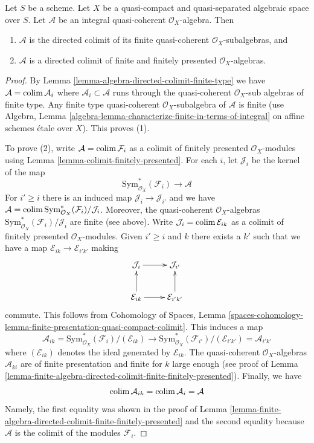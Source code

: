 \begin{lemma}
\label{lemma-integral-algebra-directed-colimit-finite}
Let $S$ be a scheme. Let $X$ be a quasi-compact and quasi-separated
algebraic space over $S$. Let $\mathcal{A}$ be an integral quasi-coherent
$\mathcal{O}_X$-algebra. Then
\begin{enumerate}
\item $\mathcal{A}$ is the directed colimit of its finite
quasi-coherent $\mathcal{O}_X$-subalgebras, and
\item $\mathcal{A}$ is a directed colimit of finite and finitely presented
$\mathcal{O}_X$-algebras.
\end{enumerate}
\end{lemma}

\begin{proof}
By Lemma \ref{lemma-algebra-directed-colimit-finite-type} we have
$\mathcal{A} = \mathop{\mathrm{colim}}\nolimits \mathcal{A}_i$ where
$\mathcal{A}_i \subset \mathcal{A}$ runs through the
quasi-coherent $\mathcal{O}_X$-sub algebras of finite type.
Any finite type quasi-coherent $\mathcal{O}_X$-subalgebra
of $\mathcal{A}$ is finite (use Algebra, Lemma
\ref{algebra-lemma-characterize-finite-in-terms-of-integral}
on affine schemes \'etale over $X$). This proves (1).

\medskip\noindent
To prove (2), write $\mathcal{A} = \mathop{\mathrm{colim}}\nolimits \mathcal{F}_i$
as a colimit of finitely presented $\mathcal{O}_X$-modules using
Lemma \ref{lemma-colimit-finitely-presented}.
For each $i$, let $\mathcal{J}_i$ be the kernel of the map
$$
\text{Sym}^*_{\mathcal{O}_X}(\mathcal{F}_i) \longrightarrow \mathcal{A}
$$
For $i' \geq i$ there is an induced map $\mathcal{J}_i \to \mathcal{J}_{i'}$
and we have $\mathcal{A} =
\mathop{\mathrm{colim}}\nolimits \text{Sym}^*_{\mathcal{O}_X}(\mathcal{F}_i)/\mathcal{J}_i$.
Moreover, the quasi-coherent $\mathcal{O}_X$-algebras
$\text{Sym}^*_{\mathcal{O}_X}(\mathcal{F}_i)/\mathcal{J}_i$
are finite (see above). Write $\mathcal{J}_i = \mathop{\mathrm{colim}}\nolimits \mathcal{E}_{ik}$
as a colimit of finitely presented $\mathcal{O}_X$-modules.
Given $i' \geq i$ and $k$ there exists a $k'$ such that we
have a map $\mathcal{E}_{ik} \to \mathcal{E}_{i'k'}$
making
$$
\xymatrix{
\mathcal{J}_i \ar[r] & \mathcal{J}_{i'} \\
\mathcal{E}_{ik} \ar[u] \ar[r] & \mathcal{E}_{i'k'} \ar[u]
}
$$
commute. This follows from
Cohomology of Spaces, Lemma
\ref{spaces-cohomology-lemma-finite-presentation-quasi-compact-colimit}.
This induces a map
$$
\mathcal{A}_{ik} =
\text{Sym}^*_{\mathcal{O}_X}(\mathcal{F}_i)/(\mathcal{E}_{ik})
\longrightarrow
\text{Sym}^*_{\mathcal{O}_X}(\mathcal{F}_{i'})/(\mathcal{E}_{i'k'}) =
\mathcal{A}_{i'k'}
$$
where $(\mathcal{E}_{ik})$ denotes the ideal generated by $\mathcal{E}_{ik}$.
The quasi-coherent $\mathcal{O}_X$-algebras $\mathcal{A}_{ki}$
are of finite presentation and finite for $k$ large enough
(see proof of
Lemma \ref{lemma-finite-algebra-directed-colimit-finite-finitely-presented}).
Finally, we have
$$
\mathop{\mathrm{colim}}\nolimits \mathcal{A}_{ik} = \mathop{\mathrm{colim}}\nolimits \mathcal{A}_i = \mathcal{A}
$$
Namely, the first equality was shown in the proof of
Lemma \ref{lemma-finite-algebra-directed-colimit-finite-finitely-presented}
and the second equality because $\mathcal{A}$ is the colimit of
the modules $\mathcal{F}_i$.
\end{proof}

